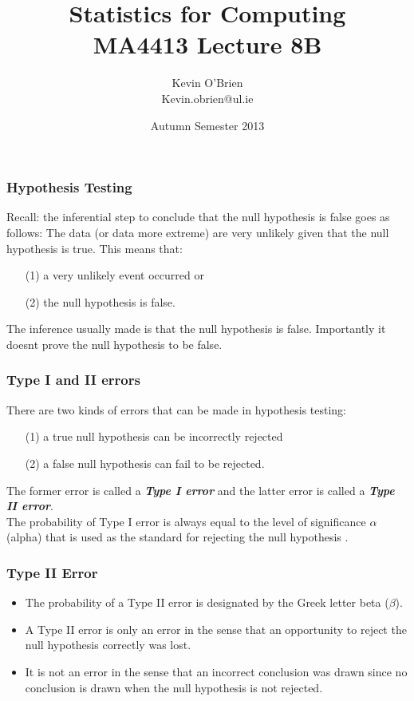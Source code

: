 ﻿\documentclass[a4]{beamer}
\title[MA4413]{Statistics for Computing \\ {\normalsize MA4413 Lecture 8B}}
\author[Kevin O'Brien]{Kevin O'Brien \\ {\scriptsize Kevin.obrien@ul.ie}}
\date{Autumn Semester 2013}
\institute[Maths \& Stats]{Dept. of Mathematics \& Statistics, \\ University \textit{of} Limerick}
\begin{document}
\begin{frame}
\frametitle{Hypothesis Testing}
\large
Recall: the inferential step to conclude that the null hypothesis is false goes as follows: The data (or data more extreme) are very unlikely given that the null hypothesis is true.
\bigskip
This means that:
\begin{itemize}\item [(1)] a very unlikely event occurred or
\item[(2)] the null hypothesis is false. \end{itemize}
The inference usually made is that the null hypothesis is false. Importantly it doesnt prove the null hypothesis to be false.
\end{frame}
\begin{frame}
\frametitle{Type I and II errors}
\large
There are two kinds of errors that can be made in hypothesis testing:
\begin{itemize}
\item[(1)] a true null hypothesis can be incorrectly rejected
\item[(2)] a false null hypothesis can fail to be rejected.
\end{itemize}
The former error is called a \textbf{\emph{Type I error}} and the latter error is called a \textbf{\emph{Type II error}}. \\ \bigskip
The probability of Type I error is always equal to the level of significance $\alpha$ (alpha) that is used as the standard for rejecting the null hypothesis .
\end{frame}
\begin{frame}
\frametitle{Type II Error}
\begin{itemize}

\item The probability of a Type II error is designated by the Greek letter beta ($\beta$).
\item A Type II error is only an error in the sense that an opportunity to reject the null hypothesis correctly was lost.
\item It is not an error in the sense that an incorrect conclusion was drawn since no conclusion is drawn when the null hypothesis is not rejected.
\end{itemize}
\end{frame}
\end{document}
